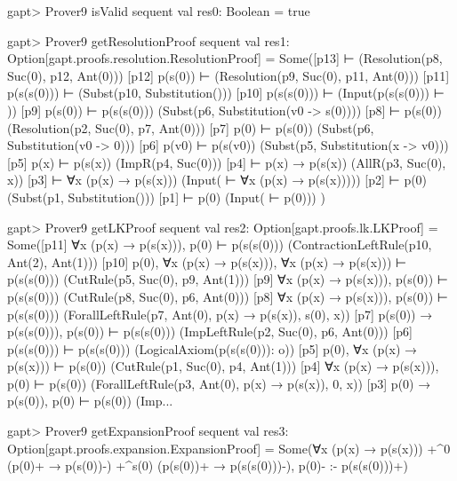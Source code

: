 \documentclass[a4paper,11pt]{book}
\begin{document}
\begin{clilisting}
  gapt> Prover9 isValid sequent
  val res0: Boolean = true

  gapt> Prover9 getResolutionProof sequent
  val res1: Option[gapt.proofs.resolution.ResolutionProof] =
  Some([p13]  ⊢    (Resolution(p8, Suc(0), p12, Ant(0)))
  [p12] p(s(0)) ⊢    (Resolution(p9, Suc(0), p11, Ant(0)))
  [p11] p(s(s(0))) ⊢    (Subst(p10, Substitution()))
  [p10] p(s(s(0))) ⊢    (Input(p(s(s(0))) ⊢ ))
  [p9] p(s(0)) ⊢ p(s(s(0)))   (Subst(p6, Substitution(v0 -> s(0))))
  [p8]  ⊢ p(s(0))   (Resolution(p2, Suc(0), p7, Ant(0)))
  [p7] p(0) ⊢ p(s(0))   (Subst(p6, Substitution(v0 -> 0)))
  [p6] p(v0) ⊢ p(s(v0))   (Subst(p5, Substitution(x -> v0)))
  [p5] p(x) ⊢ p(s(x))   (ImpR(p4, Suc(0)))
  [p4]  ⊢ p(x) → p(s(x))   (AllR(p3, Suc(0), x))
  [p3]  ⊢ ∀x (p(x) → p(s(x)))   (Input( ⊢ ∀x (p(x) → p(s(x)))))
  [p2]  ⊢ p(0)   (Subst(p1, Substitution()))
  [p1]  ⊢ p(0)   (Input( ⊢ p(0)))
  )

  gapt> Prover9 getLKProof sequent
  val res2: Option[gapt.proofs.lk.LKProof] =
  Some([p11] ∀x (p(x) → p(s(x))), p(0) ⊢ p(s(s(0)))    (ContractionLeftRule(p10, Ant(2), Ant(1)))
  [p10] p(0), ∀x (p(x) → p(s(x))), ∀x (p(x) → p(s(x))) ⊢ p(s(s(0)))    (CutRule(p5, Suc(0), p9, Ant(1)))
  [p9] ∀x (p(x) → p(s(x))), p(s(0)) ⊢ p(s(s(0)))    (CutRule(p8, Suc(0), p6, Ant(0)))
  [p8] ∀x (p(x) → p(s(x))), p(s(0)) ⊢ p(s(s(0)))    (ForallLeftRule(p7, Ant(0), p(x) → p(s(x)), s(0), x))
  [p7] p(s(0)) → p(s(s(0))), p(s(0)) ⊢ p(s(s(0)))    (ImpLeftRule(p2, Suc(0), p6, Ant(0)))
  [p6] p(s(s(0))) ⊢ p(s(s(0)))    (LogicalAxiom(p(s(s(0))): o))
  [p5] p(0), ∀x (p(x) → p(s(x))) ⊢ p(s(0))    (CutRule(p1, Suc(0), p4, Ant(1)))
  [p4] ∀x (p(x) → p(s(x))), p(0) ⊢ p(s(0))    (ForallLeftRule(p3, Ant(0), p(x) → p(s(x)), 0, x))
  [p3] p(0) → p(s(0)), p(0) ⊢ p(s(0))    (Imp...

  gapt> Prover9 getExpansionProof sequent
  val res3: Option[gapt.proofs.expansion.ExpansionProof] =
  Some(∀x (p(x) → p(s(x))) +^{0} (p(0)+ → p(s(0))-) +^{s(0)} (p(s(0))+ → p(s(s(0)))-),
  p(0)-
  :-
  p(s(s(0)))+)

\end{clilisting}
\end{document}
